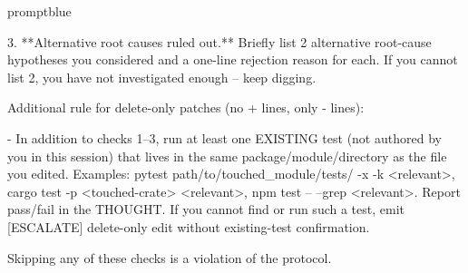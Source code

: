 \documentclass{llmxive}
\begin{document}
\begin{promptbox}{promptblue}
{3. **Alternative root causes ruled out.** Briefly list 2 alternative root-cause hypotheses you considered and a one-line rejection reason for each. If you cannot list 2, you have not investigated enough -- keep digging.\par
\vspace{0.35em}\par
Additional rule for delete-only patches (no \textasciigrave{}+\textasciigrave{} lines, only \textasciigrave{}-\textasciigrave{} lines):\par
- In addition to checks 1--3, run at least one EXISTING test (not authored by you in this session) that lives in the same package/module/directory as the file you edited. Examples: \textasciigrave{}pytest path/to/touched\_module/tests/ -x -k \textless{}relevant\textgreater{}\textasciigrave{}, \textasciigrave{}cargo test -p \textless{}touched-crate\textgreater{} \textless{}relevant\textgreater{}\textasciigrave{}, \textasciigrave{}npm test -- --grep \textless{}relevant\textgreater{}\textasciigrave{}. Report pass/fail in the THOUGHT. If you cannot find or run such a test, emit \textasciigrave{}[ESCALATE] delete-only edit without existing-test confirmation\textasciigrave{}.\par
\vspace{0.35em}\par
Skipping any of these checks is a violation of the protocol.\par
}
\end{promptbox}
\end{document}
